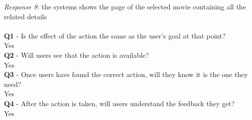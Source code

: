 \documentclass[12pt, a4paper]{article}
\numberwithin{figure}{section}
\newcommand\tab[1][1cm]{\hspace*{#1}}
\begin{document}
\textit{Response 8}: the systems shows the page of the selected movie containing all the related details\\\\
\textbf{Q1} - Is the effect of the action the same as the user’s goal at that point?\\
\tab Yes\\
\textbf{Q2} - Will users see that the action is available?\\
\tab Yes\\
\textbf{Q3} - Once users have found the correct action, will they know it is the one they need?\\
\tab Yes\\
\textbf{Q4} - After the action is taken, will users understand the feedback they get?\\
\tab Yes\\\\
\end{document}
